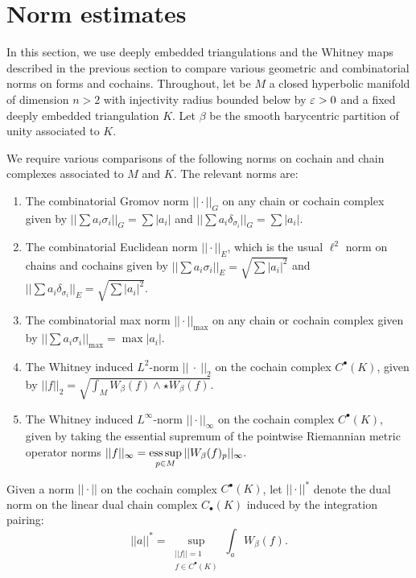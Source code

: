 
\section{Norm estimates}
\label{sec:3}

In this section, we use deeply embedded triangulations and the Whitney maps described in the previous section to compare various geometric and combinatorial norms on forms and cochains. Throughout, let be $M$ a closed hyperbolic manifold of dimension $n>2$ with injectivity radius bounded below by $\varepsilon>0$ and a fixed deeply embedded triangulation $K$. Let $\beta$ be the smooth barycentric partition of unity associated to $K$.

We require various comparisons of the following norms on cochain and chain complexes associated to $M$ and $K$. The relevant norms are:


\begin{enumerate}
    \item The combinatorial Gromov norm $||\cdot||_G$ on any chain or cochain complex given by $||\sum a_i\sigma_i||_G = \sum|a_i|$ and $||\sum a_i\delta_{\sigma_i}||_G = \sum|a_i|$.
    \item The combinatorial Euclidean norm $||\cdot||_E$, which is the usual $\ell^2$ norm on chains and cochains given by $ ||\sum a_i\sigma_i||_E = \sqrt{\sum|a_i|^2}$ and  $ ||\sum a_i\delta_{\sigma_i}||_E = \sqrt{\sum|a_i|^2}$.
     \item The combinatorial max norm $||\cdot||_{\max}$ on any chain or cochain complex given by $||\sum a_i\sigma_i||_{\max} = \max|a_i|$.

    \item The Whitney induced $L^2$-norm $||~\cdot~||_2$ on the cochain complex $C^{\bullet}(K)$, given by $||f||_2 = \sqrt{\int_MW_{\beta}(f)\wedge\star W_{\beta}(f)}$.

    \item The Whitney induced $L^{\infty}$-norm $||\cdot||_{\infty}$ on the cochain complex $C^{\bullet}(K)$, given by taking the essential supremum of the pointwise Riemannian metric operator norms $||f||_{\infty} = \operatorname*{ess\,sup}\limits_{p\in M} ||W_{\beta}(f)_p||_{\infty}.$
\end{enumerate}

Given a norm $||\cdot||$ on the cochain complex $C^{\bullet}(K)$, let $||\cdot||^*$ denote the dual norm on the linear dual chain complex $C_{\bullet}(K)$ induced by the integration pairing: $$||a||^* = \sup\limits_{\substack{||f||=1\\ f\in C^{\bullet}(K)}} \int_a W_{\beta}(f).$$

